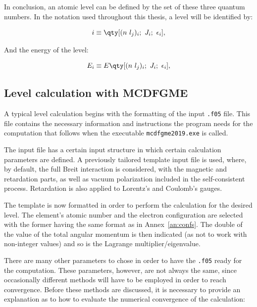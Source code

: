 In conclusion, an atomic level can be defined by the set of these three quantum numbers. In the notation used throughout this thesis, a level will be identified by:

\begin{equation}
    i\equiv \qty[(n\ l_j)_i;\ J_i;\ \epsilon_i],
    \label{eq:level_notation}
\end{equation}

And the energy of the level:

\begin{equation}
    E_i\equiv E \qty[(n\ l_j)_i;\ J_i;\ \epsilon_i],
\end{equation}



\subsection{Level calculation with \gls{MCDFGME}}

A typical level calculation begins with the formatting of the input \verb|.f05| file. This file contains the necessary information and instructions the program needs for the computation that follows when the executable \verb|mcdfgme2019.exe| is called.

The input file has a certain input structure in which certain calculation parameters are defined. A previously tailored template input file is used, where, by default, the full Breit interaction is considered, with the magnetic and retardation parts, as well as vacuum polarization  included in the self-consistent process. Retardation is also applied to Lorentz's and Coulomb's gauges.

The template is now formatted in order to perform the calculation for the desired level. The element's atomic number and the electron configuration are selected with the former having the same format as in Annex~\ref{an:confs}. The double of the value of the  total angular momentum is then indicated (as not to work with non-integer values) and so is the Lagrange multiplier/eigenvalue.

There are many other parameters to chose in order to have the \verb|.f05| ready for the computation. These parameters, however, are not always the same, since occasionally different methods will have to be employed in order to reach convergence. Before these methods are discussed, it is necessary to provide an explanation as to how to evaluate the numerical convergence of the calculation:

